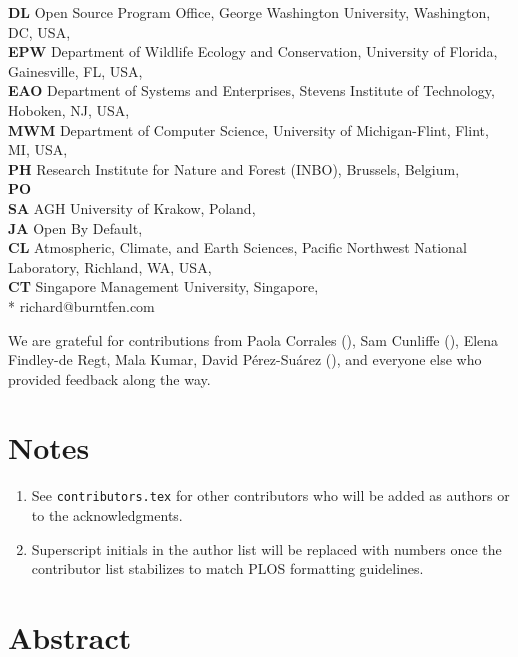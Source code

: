 \documentclass[10pt,letterpaper]{article}
\begin{document}
\begin{flushleft}
\textbf{DL} Open Source Program Office, George Washington University, Washington, DC, USA, \\
\textbf{EPW} Department of Wildlife Ecology and Conservation, University of Florida, Gainesville, FL, USA, \\
\textbf{EAO} Department of Systems and Enterprises, Stevens Institute of Technology, Hoboken, NJ, USA, \\
\textbf{MWM} Department of Computer Science, University of Michigan-Flint, Flint, MI, USA, \\
\textbf{PH} Research Institute for Nature and Forest (INBO), Brussels, Belgium, \\
\textbf{PO} \\
\textbf{SA} AGH University of Krakow, Poland, \\
\textbf{JA} Open By Default, \\
\textbf{CL} Atmospheric, Climate, and Earth Sciences, Pacific Northwest National Laboratory, Richland, WA, USA, \\
\textbf{CT} Singapore Management University, Singapore, \\
* richard@burntfen.com
\end{flushleft}

\noindent
We are grateful for contributions from
Paola Corrales (),
Sam Cunliffe (),
Elena Findley-de Regt,
Mala Kumar,
David Pérez-Suárez (),
and everyone else who provided feedback along the way.

\section*{Notes}

\begin{enumerate}
\item
  See \texttt{contributors.tex} for other contributors who will be added as authors or to the acknowledgments.
\item
  Superscript initials in the author list will be replaced with numbers once the contributor list stabilizes to match PLOS formatting guidelines.
\end{enumerate}

\section*{Abstract}
\end{document}

